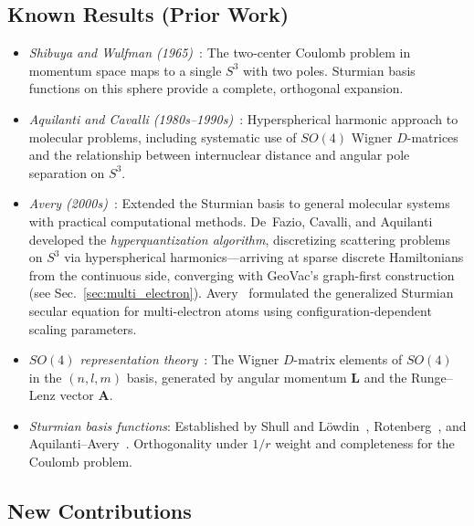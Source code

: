 \documentclass[aps,pra,twocolumn,superscriptaddress,longbibliography]{revtex4-2}
\begin{document}
\subsection{Known Results (Prior Work)}

\begin{itemize}

\item \textit{Shibuya and Wulfman (1965)}~\cite{Shibuya1965}: The
two-center Coulomb problem in momentum space maps to a single $S^3$
with two poles.  Sturmian basis functions on this sphere provide a
complete, orthogonal expansion.

\item \textit{Aquilanti and Cavalli
(1980s--1990s)}~\cite{Aquilanti1986,Aquilanti1990}: Hyperspherical
harmonic approach to molecular problems, including systematic use of
$SO(4)$ Wigner $D$-matrices and the relationship between internuclear
distance and angular pole separation on $S^3$.

\item \textit{Avery (2000s)}~\cite{Avery2006}: Extended the Sturmian
basis to general molecular systems with practical computational methods.
De~Fazio, Cavalli, and Aquilanti~\cite{DeFazio2003} developed the
\emph{hyperquantization algorithm}, discretizing scattering problems
on $S^3$ via hyperspherical harmonics---arriving at sparse discrete
Hamiltonians from the continuous side, converging with GeoVac's
graph-first construction (see Sec.~\ref{sec:multi_electron}).
Avery~\cite{Avery2004} formulated the generalized Sturmian secular
equation for multi-electron atoms using configuration-dependent
scaling parameters.

\item \textit{$SO(4)$ representation theory}~\cite{Bander1966,%
Biedenharn1981}: The Wigner $D$-matrix elements of $SO(4)$ in the
$(n, l, m)$ basis, generated by angular momentum $\mathbf{L}$ and the
Runge--Lenz vector $\mathbf{A}$.

\item \textit{Sturmian basis functions}: Established by Shull and
L\"owdin~\cite{shull_lowdin}, Rotenberg~\cite{rotenberg}, and
Aquilanti--Avery~\cite{aquilanti_avery,avery_book}.  Orthogonality
under $1/r$ weight and completeness for the Coulomb problem.

\end{itemize}

\subsection{New Contributions}
\end{document}

